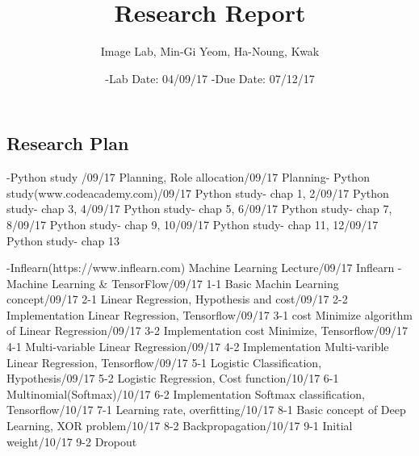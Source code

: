 \documentclass{article}
\title{Research Report}
\author{Image Lab, Min-Gi Yeom, Ha-Noung, Kwak }
\date{-Lab Date: 04/09/17      -Due Date: 07/12/17}
\begin{document}
\begin{CJK}{UTF8}{}
\maketitle

\section{Research Plan}
      -Python study /09/17 Planning, Role allocation/09/17 Planning- Python study(www.codeacademy.com)/09/17 Python study- chap 1, 2/09/17 Python study- chap 3, 4/09/17 Python study- chap 5, 6/09/17 Python study- chap 7, 8/09/17 Python study- chap 9, 10/09/17 Python study- chap 11, 12/09/17 Python study- chap 13\newline\newline

-Inflearn(https://www.inflearn.com) Machine Learning Lecture/09/17 Inflearn -Machine Learning & TensorFlow/09/17 1-1 Basic Machin Learning concept/09/17 2-1 Linear Regression, Hypothesis and cost/09/17 2-2 Implementation Linear Regression, Tensorflow/09/17 3-1 cost Minimize algorithm of Linear Regression/09/17 3-2 Implementation cost Minimize, Tensorflow/09/17 4-1 Multi-variable Linear Regression/09/17 4-2 Implementation Multi-varible Linear Regression, Tensorflow/09/17 5-1 Logistic Classification, Hypothesis/09/17 5-2 Logistic Regression, Cost function/10/17 6-1 Multinomial(Softmax)/10/17 6-2 Implementation Softmax classification, Tensorflow/10/17 7-1 Learning rate, overfitting/10/17 8-1 Basic concept of Deep Learning, XOR problem/10/17 8-2 Backpropagation/10/17 9-1 Initial weight/10/17 9-2 Dropout\newline


\end{CJK}
\end{document}
